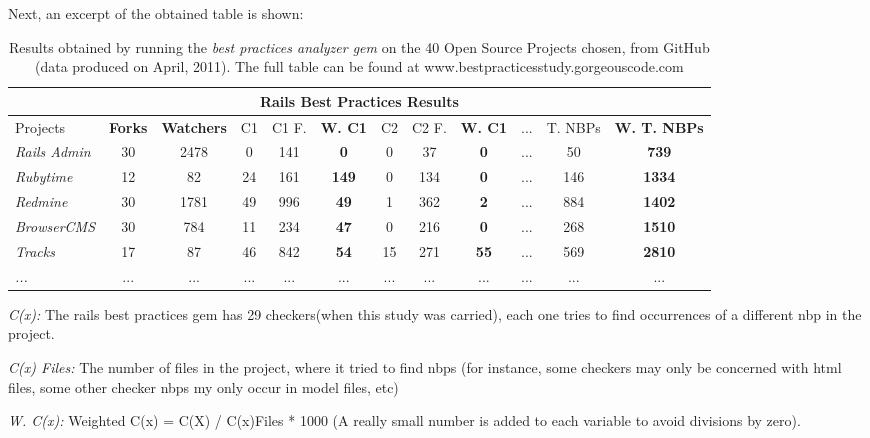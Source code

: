 Next, an excerpt of the obtained table is shown:
\begin{table}[H]
\begin{center}
{\scriptsize
\begin{threeparttable}
\begin{tabular}{|l||c|c|c|c|c|c|c|c|c|c|c|} \hline
\multicolumn{12}{|c|}{Rails Best Practices Results} \\ \hline
Projects & \textbf{Forks}         & \textbf{Watchers} & 
C1       & C1 F.                  & \textbf{W. C1} & 
C2       & C2 F.                  & \textbf{W.       C1} & 
...      & T. NBPs                & \textbf{W.  T. NBPs} \\\hline\hline
\emph{Rails Admin } & 30 & 2478 &  0 & 141 & \textbf{  0 }&  0 &  37 & \textbf{ 0} & ...&  50 & \textbf{ 739}  \\ \hline
\emph{Rubytime    } & 12 &   82 & 24 & 161 & \textbf{149 }&  0 & 134 & \textbf{ 0} & ...& 146 & \textbf{1334}  \\ \hline
\emph{Redmine     } & 30 & 1781 & 49 & 996 & \textbf{ 49 }&  1 & 362 & \textbf{ 2} & ...& 884 & \textbf{1402}  \\ \hline
\emph{BrowserCMS  } & 30 &  784 & 11 & 234 & \textbf{ 47 }&  0 & 216 & \textbf{ 0} & ...& 268 & \textbf{1510}  \\ \hline
\emph{Tracks      } & 17 &   87 & 46 & 842 & \textbf{ 54 }& 15 & 271 & \textbf{55} & ...& 569 & \textbf{2810}  \\ \hline
\emph{...}&...&...&...&...&...&...&...&...&...&...&...\\ \hline
\end{tabular} 

\begin{tablenotes}
  \item{ \emph{C(x): }} The rails best practices gem has 29 checkers(when this study was carried), each one tries to find occurrences of a different nbp in the project. 
  \item{\emph{C(x) Files: }} The number of files in the project, where it tried to find nbps (for instance, some checkers may only be concerned with html files, some other checker nbps my only occur in model files, etc)
  \item{\emph{W. C(x): }} Weighted C(x) = C(X) / C(x)Files * 1000 (A really small number is added to each variable to avoid divisions by zero).
\end{tablenotes}
\end{threeparttable}
}
\end{center}
\caption{Results obtained by running the \emph{best practices analyzer gem} on the 40 Open Source Projects chosen, from GitHub (data produced on April, 2011). The full table can be found at www.bestpracticesstudy.gorgeouscode.com}
\label{table:OSPHWebSites}
\end{table}

